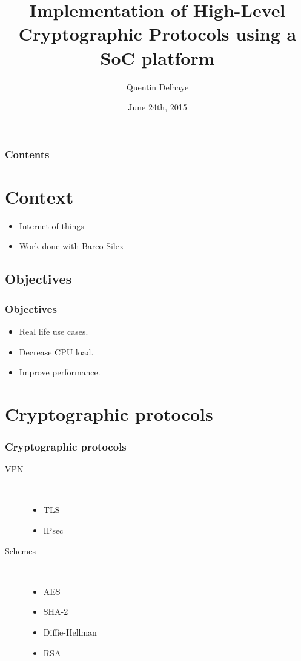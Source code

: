 \documentclass[xcolor={x11names, rgb, usenames, dvipsnames}]{beamer}
\author{Quentin Delhaye}
\title[Crypto using a Soc Platform]{Implementation of High-Level\\ Cryptographic Protocols using a SoC platform}
\institute[ULB]{Université Libre de Bruxelles}
\date{June 24th, 2015}
\begin{document}
\begin{frame}
\titlepage
\end{frame}

\begin{frame}
	\frametitle{Contents}
	\tableofcontents[hideallsubsections]
\end{frame}


\section{Context}

\begin{frame}
\begin{itemize}
	\item Internet of things
	\item Work done with Barco Silex
\end{itemize}
\end{frame}

\subsection{Objectives}
\begin{frame}
\frametitle{Objectives}
\begin{itemize}
	\item Real life use cases.
	\item Decrease CPU load.
	\item Improve performance.
\end{itemize}
\end{frame}







\section{Cryptographic protocols}

\begin{frame}
\frametitle{Cryptographic protocols}
\begin{description}
	\item[VPN]~\\
		\begin{itemize}
			\item TLS
			\item IPsec
		\end{itemize}
	\item[Schemes]~\\
		\begin{itemize}
			\item AES
			\item SHA-2
			\item Diffie-Hellman
			\item RSA
		\end{itemize}
\end{description}
\end{frame}
\end{document}

